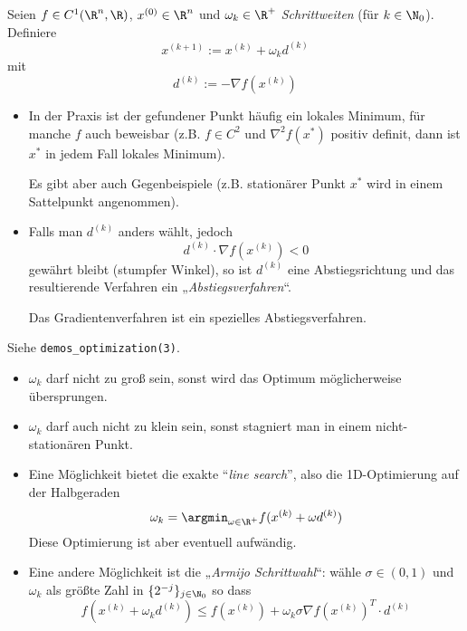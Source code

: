 \documentclass[11pt]{scrartcl}
\begin{document}
\begin{df}[Gradientenverfahren] \label{4.6}
	Seien $f \in C^1(\R^n, \R)$, $x^{(0)} \in \R^n$ und $\omega_k \in \R^+$ \emph{Schrittweiten} (für $k \in \N_0$).
	Definiere
	\[
		x^{(k+1)} := x^{(k)} + \omega_k d^{(k)}
	\]
	mit
	\[
		d^{(k)} := - \nabla f(x^{(k)})
	\]
	\begin{note}[Optimalität]
		\begin{itemize}
			\item
				In der Praxis ist der gefundener Punkt häufig ein lokales Minimum, für manche $f$ auch beweisbar (z.B. $f \in C^2$ und $\nabla^2 f(x^*)$ positiv definit, dann ist $x^*$ in jedem Fall lokales Minimum).

				Es gibt aber auch Gegenbeispiele (z.B. stationärer Punkt $x^*$ wird in einem Sattelpunkt angenommen).
		\end{itemize}
	\end{note}
	\begin{note}[Abstiegsrichtung]
		\begin{itemize}
			\item
				Falls man $d^{(k)}$ anders wählt, jedoch
				\[
					d^{(k)} \cdot \nabla f(x^{(k)}) < 0
				\]
				gewährt bleibt (stumpfer Winkel), so ist $d^{(k)}$ eine Abstiegsrichtung und das resultierende Verfahren ein „\emph{Abstiegsverfahren}“.
				
				Das Gradientenverfahren ist ein spezielles Abstiegsverfahren.
		\end{itemize}
	\end{note}
	\begin{note}[Schrittweite]
		Siehe \verb|demos_optimization(3)|.
		\begin{itemize}
			\item
				$\omega_k$ darf nicht zu groß sein, sonst wird das Optimum möglicherweise übersprungen.
			\item
				$\omega_k$ darf auch nicht zu klein sein, sonst stagniert man in einem nicht-stationären Punkt.
			\item
				Eine Möglichkeit bietet die exakte “\emph{line search}”, also die 1D-Optimierung auf der Halbgeraden
				\[
					\omega_k = \argmin_{\omega \in \R^+} f(x^{(k)} + \omega d^{(k)})
				\]
				Diese Optimierung ist aber eventuell aufwändig.
			\item
				Eine andere Möglichkeit ist die „\emph{Armijo Schrittwahl}“: wähle $\sigma \in (0,1)$ und $\omega_k$ als größte Zahl in $\{2^{-j}\}_{j\in \N_0}$ so dass
				\[
					f(x^{(k)} + \omega_k d^{(k)}) \le f(x^{(k)}) + \omega_k \sigma \nabla f(x^{(k)})^T \cdot d^{(k)}
				\]
		\end{itemize}
	\end{note}
\end{df}
\end{document}
